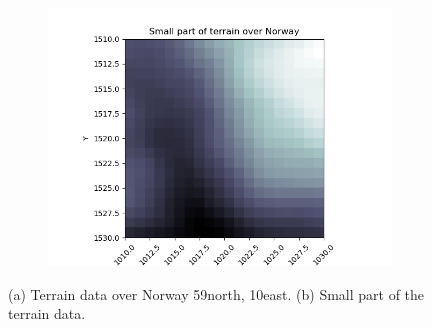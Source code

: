 \documentclass[../main.tex]{subfiles}
\begin{document}
\begin{figure}[htb]
\begin{subfigure}[b]{0.45\textwidth}
    \caption{}
    \label{fig:terrain_Norway}
   \end{subfigure}
   \quad
   \begin{subfigure}[b]{0.45\textwidth}
    \centering
    \includegraphics[width=\textwidth]{../assets/part_of_terrain.png} 
    \caption{}
   \end{subfigure}
   \caption{(a) Terrain data over Norway 59\degree north, 10\degree east. (b) Small part of the terrain data.}
\end{figure} 
\end{document}
